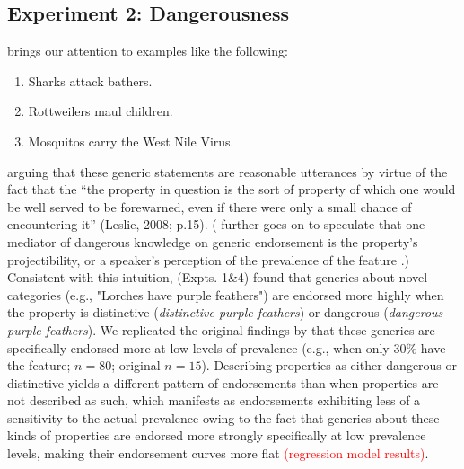 \documentclass[floatsintext, 11pt, doc]{apa6}
\newcommand{\red}[1]{\textcolor{Red}{#1}}
\begin{document}
\subsection{Experiment 2: Dangerousness}


 brings our attention to examples like the following:

\begin{enumerate}
\item Sharks attack bathers.
\item Rottweilers maul children. 
\item Mosquitos carry the West Nile Virus.
\end{enumerate}

\noindent arguing that these generic statements are reasonable utterances by virtue of the fact that the ``the property in question is the sort of property of which one would be well served to be forewarned, even if there were only a small chance of encountering it'' (Leslie, 2008; p.15).
( further goes on to speculate that one mediator of dangerous knowledge on generic endorsement is the property's projectibility, or a speaker's perception of the prevalence of the feature \cite{Rothbart1978}.)
Consistent with this intuition,   (Expts. 1\&4) found that generics about novel categories (e.g., "Lorches have purple feathers") are endorsed more highly when the property is distinctive (\emph{distinctive purple feathers}) or dangerous (\emph{dangerous purple feathers}).
We replicated the original findings by  that these generics are specifically endorsed more at low levels of prevalence (e.g., when only 30\% have the feature; $n=80$; original $n=15$). 
Describing properties as either dangerous or distinctive yields a different pattern of endorsements than when properties are not described as such, which manifests as endorsements exhibiting less of a sensitivity to the actual prevalence owing to the fact that generics about these kinds of properties are endorsed more strongly specifically at low prevalence levels, making their endorsement curves more flat \red{(regression model results)}. 
\end{document}
